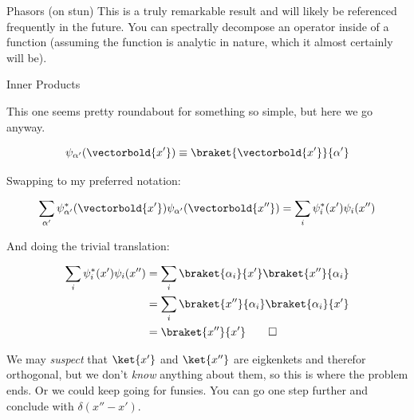 \begin{answer}
\begin{answerpart}{Phasors (on stun)}
  This is a truly remarkable result and will likely be referenced
  frequently in the future.  You can spectrally decompose an operator
  inside of a function (assuming the function is analytic in nature,
  which it almost certainly will be).
  
\end{answerpart}



\begin{answerpart}{Inner Products}

  This one seems pretty roundabout for something so simple, but here
  we go anyway.

  \begin{equation}
    \psi_{\alpha'}(\vectorbold{x'}) \equiv \braket{\vectorbold{x'}}{\alpha'}
  \end{equation}

  Swapping to my preferred notation:
  
  \begin{equation}
    \sum_{\alpha'} \psi_{\alpha'}^*(\vectorbold{x'}) \psi_{\alpha'}(\vectorbold{x''})
    = \sum_i \psi_i^*(x')\psi_i(x'')
  \end{equation}

  And doing the trivial translation:
  
  \begin{equation}
    \begin{split}
      \sum_i \psi_i^*(x')\psi_i(x'')
      &= \sum_i \braket{\alpha_i}{x'}\braket{x''}{\alpha_i}\\
      &= \sum_i \braket{x''}{\alpha_i}\braket{\alpha_i}{x'}\\
      &= \braket{x''}{x'} \qed\\
    \end{split}
  \end{equation}

  We may \emph{suspect} that $\ket{x'}$ and $\ket{x''}$ are eigkenkets
  and therefor orthogonal, but we don't \emph{know} anything about
  them, so this is where the problem ends.  Or we could keep going for
  funsies.  You can go one step further and conclude with
  $\delta(x''-x')$.
  
\end{answerpart}
\end{answer}
